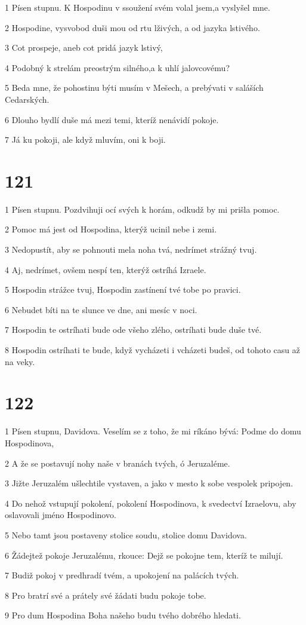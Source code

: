 \par 1 Písen stupnu. K Hospodinu v ssoužení svém volal jsem,a vyslyšel mne.
\par 2 Hospodine, vysvobod duši mou od rtu lživých, a od jazyka lstivého.
\par 3 Cot prospeje, aneb cot pridá jazyk lstivý,
\par 4 Podobný k strelám preostrým silného,a k uhlí jalovcovému?
\par 5 Beda mne, že pohostinu býti musím v Mešech, a prebývati v saláších Cedarských.
\par 6 Dlouho bydlí duše má mezi temi, kteríž nenávidí pokoje.
\par 7 Já ku pokoji, ale když mluvím, oni k boji.

\chapter{121}

\par 1 Písen stupnu. Pozdvihuji ocí svých k horám, odkudž by mi prišla pomoc.
\par 2 Pomoc má jest od Hospodina, kterýž ucinil nebe i zemi.
\par 3 Nedopustít, aby se pohnouti mela noha tvá, nedrímet strážný tvuj.
\par 4 Aj, nedrímet, ovšem nespí ten, kterýž ostríhá Izraele.
\par 5 Hospodin strážce tvuj, Hospodin zastínení tvé tobe po pravici.
\par 6 Nebudet bíti na te slunce ve dne, ani mesíc v noci.
\par 7 Hospodin te ostríhati bude ode všeho zlého, ostríhati bude duše tvé.
\par 8 Hospodin ostríhati te bude, když vycházeti i vcházeti budeš, od tohoto casu až na veky.

\chapter{122}

\par 1 Písen stupnu, Davidova. Veselím se z toho, že mi ríkáno bývá: Podme do domu Hospodinova,
\par 2 A že se postavují nohy naše v branách tvých, ó Jeruzaléme.
\par 3 Jižte Jeruzalém ušlechtile vystaven, a jako v mesto k sobe vespolek pripojen.
\par 4 Do nehož vstupují pokolení, pokolení Hospodinova, k svedectví Izraelovu, aby oslavovali jméno Hospodinovo.
\par 5 Nebo tamt jsou postaveny stolice soudu, stolice domu Davidova.
\par 6 Žádejtež pokoje Jeruzalému, rkouce: Dejž se pokojne tem, kteríž te milují.
\par 7 Budiž pokoj v predhradí tvém, a upokojení na palácích tvých.
\par 8 Pro bratrí své a prátely své žádati budu pokoje tobe.
\par 9 Pro dum Hospodina Boha našeho budu tvého dobrého hledati.

